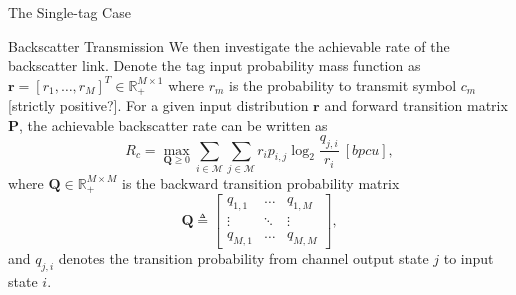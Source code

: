\documentclass[journal]{IEEEtran}
\begin{document}
\begin{section}{The Single-tag Case}
\begin{subsection}{Backscatter Transmission}
			We then investigate the achievable rate of the backscatter link. Denote the tag input probability mass function as $\boldsymbol{r} = [r_1,\ldots,r_M]^T \in \mathbb{R}_+^{M \times 1}$ where $r_m$ is the probability to transmit symbol $c_m$ [strictly positive?]. For a given input distribution $\boldsymbol{r}$ and forward transition matrix $\boldsymbol{P}$, the achievable backscatter rate can be written as
			\begin{equation}
				R_c = \max_{\boldsymbol{Q} \ge 0} \sum_{i \in \mathcal{M}} \sum_{j \in \mathcal{M}} r_i p_{i,j} \log_2 \frac{q_{j, i}}{r_i} \ [\si{bpcu}],
				\label{eq:secondary_rate}
			\end{equation}
			where $\boldsymbol{Q} \in \mathbb{R}_{+}^{M \times M}$ is the backward transition probability matrix
			\begin{equation}
				\boldsymbol{Q} \triangleq
				\begin{bmatrix}
					q_{1, 1} & \ldots & q_{1, M} \\
					\vdots & \ddots & \vdots \\
					q_{M, 1} & \ldots & q_{M, M}
				\end{bmatrix},
			\end{equation}
			and $q_{j, i}$ denotes the transition probability from channel output state $j$ to input state $i$.
		\end{subsection}


\end{section}
\end{document}
